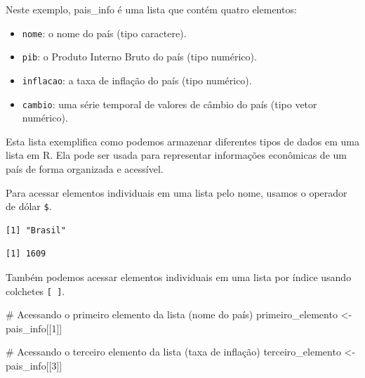 \documentclass[
  letterpaper,
  DIV=11,
  numbers=noendperiod]{scrreprt}
\newenvironment{Shaded}{\begin{snugshade}}{\end{snugshade}}
\newcommand{\CommentTok}[1]{\textcolor[rgb]{0.37,0.37,0.37}{#1}}
\newcommand{\DecValTok}[1]{\textcolor[rgb]{0.68,0.00,0.00}{#1}}
\newcommand{\NormalTok}[1]{\textcolor[rgb]{0.00,0.23,0.31}{#1}}
\newcommand{\OtherTok}[1]{\textcolor[rgb]{0.00,0.23,0.31}{#1}}
\newcommand{\SpecialCharTok}[1]{\textcolor[rgb]{0.37,0.37,0.37}{#1}}
\providecommand{\tightlist}{%
  \setlength{\itemsep}{0pt}\setlength{\parskip}{0pt}}\usepackage{longtable,booktabs,array}
\begin{document}
Neste exemplo, pais\_info é uma lista que contém quatro elementos:

\begin{itemize}
\tightlist
\item
  \texttt{nome}: o nome do país (tipo caractere).
\item
  \texttt{pib}: o Produto Interno Bruto do país (tipo numérico).
\item
  \texttt{inflacao}: a taxa de inflação do país (tipo numérico).
\item
  \texttt{cambio}: uma série temporal de valores de câmbio do país (tipo
  vetor numérico).
\end{itemize}

Esta lista exemplifica como podemos armazenar diferentes tipos de dados
em uma lista em R. Ela pode ser usada para representar informações
econômicas de um país de forma organizada e acessível.

Para acessar elementos individuais em uma lista pelo nome, usamos o
operador de dólar \texttt{\$}.

\begin{Shaded}
\end{Shaded}

\begin{verbatim}
[1] "Brasil"
\end{verbatim}

\begin{Shaded}
\end{Shaded}

\begin{verbatim}
[1] 1609
\end{verbatim}

Também podemos acessar elementos individuais em uma lista por índice
usando colchetes \texttt{{[}\ {]}}.

\begin{Shaded}
\begin{Highlighting}[]
\CommentTok{\# Acessando o primeiro elemento da lista (nome do país)}
\NormalTok{primeiro\_elemento }\OtherTok{\textless{}{-}}\NormalTok{ pais\_info[[}\DecValTok{1}\NormalTok{]]}

\CommentTok{\# Acessando o terceiro elemento da lista (taxa de inflação)}
\NormalTok{terceiro\_elemento }\OtherTok{\textless{}{-}}\NormalTok{ pais\_info[[}\DecValTok{3}\NormalTok{]]}
\end{Highlighting}
\end{Shaded}
\end{document}
